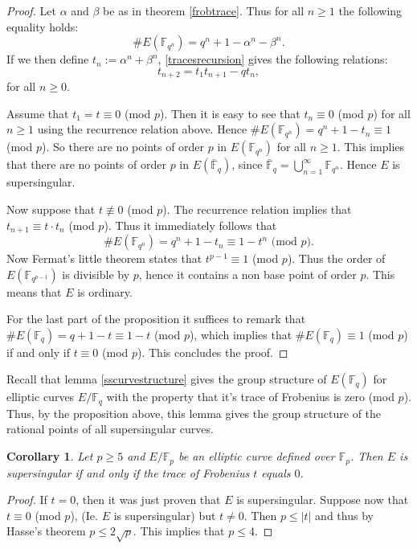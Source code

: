 \documentclass{article}
\numberwithin{equation}{section}
\newtheorem{corollary}[theorem]{Corollary}
\theoremstyle{definition}
\newcommand{\FF}[1]{{\mathbb F}_{#1}} %
\newcommand{\FFCL}[1]{{\bar {\mathbb F}}_{#1}} %
\begin{document}
\begin{proof}
Let $\alpha$ and $\beta$ be as in theorem \ref{frobtrace}. Thus for all $n \geq 1$ the following equality holds: $$\#E(\FF{q^n}) = q^n+1-\alpha^n - \beta^n.$$ If we then define $t_n:= \alpha^n+\beta^n$, \ref{tracesrecursion} gives the following relations: $$t_{n+2}=t_1t_{n+1}-qt_n,$$ for all $n \geq 0$.\par
Assume that $t_1=t \equiv 0$ (mod $p$). Then it is easy to see that $t_n \equiv 0$ (mod $p$) for all $n \geq 1$ using the recurrence relation above. Hence $\#E(\FF{q^n}) = q^n +1 -t_n \equiv 1$ (mod $p$). So there are no points of order $p$ in $E(\FF{q^n})$ for all $n \geq 1$. This implies that there are no points of order $p$ in $E(\FFCL{q})$, since $\FFCL{q} = \bigcup_{n=1}^\infty \FF{q^n}$. Hence $E$ is supersingular.\par
Now suppose that $t \not\equiv 0$ (mod $p$). The recurrence relation implies that $t_{n+1} \equiv t \cdot t_n$ (mod $p$). Thus it immediately follows that $$\#E(\FF{q^n}) = q^n+1 -t_n \equiv 1-t^n \text{ (mod } p).$$ Now Fermat's little theorem states that $t^{p-1} \equiv 1$ (mod $p$). Thus the order of $E(\FF{q^{p-1}})$ is divisible by $p$, hence it contains a non base point of order $p$. This means that $E$ is ordinary. \par
For the last part of the proposition it suffices to remark that $\#E(\FF{q}) =q+1-t \equiv 1-t$ (mod $p$), which implies that $\#E(\FF{q}) \equiv 1$ (mod $p$) if and only if $t \equiv 0$ (mod $p$). This concludes the proof.
\end{proof}

Recall that lemma \ref{sscurvestructure} gives the group structure of $E(\FF{q})$ for elliptic curves $E/\FF{q}$ with the property that it's trace of Frobenius is zero (mod $p$). Thus, by the proposition above, this lemma gives the group structure of the rational points of all supersingular curves. 

\begin{corollary}
Let $p \geq 5$ and $E/ \FF{p}$ be an elliptic curve defined over $\FF{p}$. Then $E$ is supersingular if and only if the trace of Frobenius $t$ equals $0$. 
\end{corollary}

\begin{proof}
If $t = 0$, then it was just proven that $E$ is supersingular. Suppose now that $t \equiv 0$ (mod $p$), (Ie. $E$ is supersingular) but $t \neq 0$. Then $p \leq |t|$ and thus by Hasse's theorem $p \leq 2 \sqrt{p}$. This implies that $p \leq 4$.
\end{proof}
\end{document}
